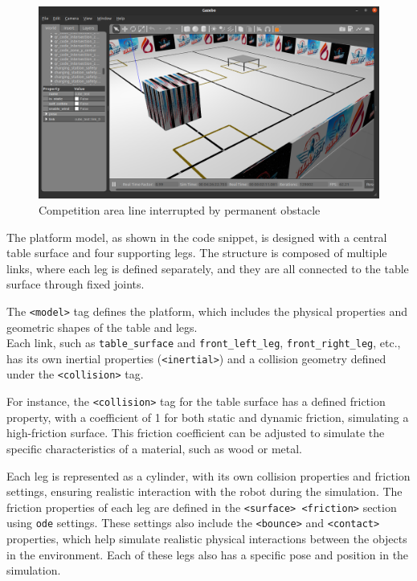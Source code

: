 \documentclass[../../main]{subfiles}
\begin{document}
\begin{itemize}
    \begin{figure}[H]
        \centering
    \includegraphics[width=\textwidth]{fig/load.png}
    \caption{Competition area line interrupted by permanent obstacle}
    \label{Permanent obstacle} %
    \end{figure}

    The platform model, as shown in the code snippet, is designed with a central table surface and four supporting legs. 
The structure is composed of multiple links, where each leg is defined separately, and they are all connected to the table surface through fixed joints.

The \texttt{<model>} tag defines the platform, which includes the physical properties and\\ geometric shapes of the table and legs. \\
Each link, such as \texttt{table\_surface} and \texttt{front\_left\_leg}, \texttt{front\_right\_leg}, etc., has its own inertial properties (\texttt{<inertial>}) 
and a collision geometry defined under the \texttt{<collision>} tag. 

For instance, the \texttt{<collision>} tag for the table surface has a defined friction property, with a coefficient of 1 for both static and dynamic friction, 
simulating a high-friction surface. This friction coefficient can be adjusted to simulate the specific characteristics of a material, such as wood or metal.

Each leg is represented as a cylinder, with its own collision properties and friction settings, ensuring realistic interaction with the robot 
during the simulation. The friction properties of each leg are defined in the \texttt{<surface> \texttt{<friction>}} section using \texttt{ode} settings. 
These settings also include the \texttt{<bounce>} and \texttt{<contact>} properties, which help simulate realistic physical interactions between the objects in the environment. 
Each of these legs also has a specific pose and position in the simulation.


\end{itemize}
\end{document}
